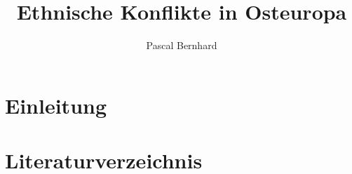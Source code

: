 \documentclass[
10pt,			%
paper=a4,		%
ngerman,		%
BCOR=0pt,		%
DIV=calc,		%
headinclude,	%
headsepline,	%
numbers=noenddot,
twocolumn,
]{scrartcl}
\title{Ethnische Konflikte in Osteuropa}
\author{Pascal Bernhard}
\begin{document}
\maketitle

\begin{abstract}

\end{abstract}

\section{Einleitung}

\section{Literaturverzeichnis}
\end{document}
